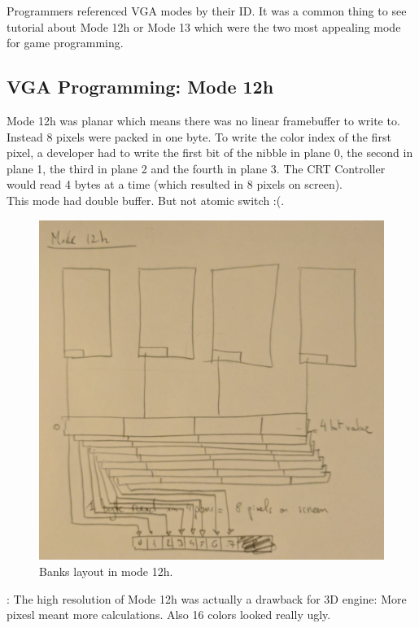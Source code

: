 \documentclass[book.tex]{subfiles}
\begin{document}
 Programmers referenced VGA modes by their ID. It was a common thing to see tutorial about Mode 12h or Mode 13 which were the two most appealing mode for game programming.


 
 

 \subsection{VGA Programming: Mode 12h}
Mode 12h was planar which means there was no linear framebuffer to write to. Instead 8 pixels were packed in one byte. To write the color index of the first pixel, a developer had to write the first bit of the nibble in plane 0, the second in plane 1, the third in plane 2 and the fourth in plane 3. The CRT Controller would read 4 bytes at a time (which resulted in 8 pixels on screen).\\ This mode had double buffer. But not atomic switch :(.
\par
\begin{figure}[H]
\centering
 \includegraphics[width=\textwidth]{imgs/mode_12h.png}
\caption{Banks layout in mode 12h.}
\end{figure}
\par
{}: The high resolution of Mode 12h was actually a drawback for 3D engine: More pixesl meant more calculations. Also 16 colors looked really ugly.
\end{document}

